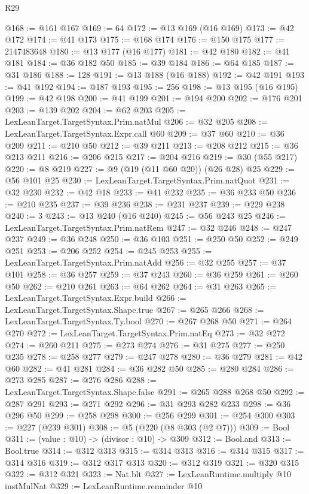 \begin{lexlean}{R29}
\begin{coremodule}
@168 := @161 @167
@169 := 64
@172 := @13 @169 (@16 @169)
@173 := @42 @172
@174 := @41 @173
@175 := @168 @174
@176 := @150 @175
@177 := 2147483648
@180 := @13 @177 (@16 @177)
@181 := @42 @180
@182 := @41 @181
@184 := @36 @182 @50
@185 := @39 @184
@186 := @64 @185
@187 := @31 @186
@188 := 128
@191 := @13 @188 (@16 @188)
@192 := @42 @191
@193 := @41 @192
@194 := @187 @193
@195 := 256
@198 := @13 @195 (@16 @195)
@199 := @42 @198
@200 := @41 @199
@201 := @194 @200
@202 := @176 @201
@203 := @139 @202
@204 := @62 @203
@205 := LexLeanTarget.TargetSyntax.Prim.natMul
@206 := @32 @205
@208 := LexLeanTarget.TargetSyntax.Expr.call @60
@209 := @37 @60
@210 := @36 @209
@211 := @210 @50
@212 := @39 @211
@213 := @208 @212
@215 := @36 @213 @211
@216 := @206 @215
@217 := @204 @216
@219 := @30 (@55 @217)
@220 := @8 @219
@227 := @9 (@19 (@11 @60 @20)) (@26 @28) @25
@229 := @56 @101 @25
@230 := LexLeanTarget.TargetSyntax.Prim.natQuot
@231 := @32 @230
@232 := @42 @18
@233 := @41 @232
@235 := @36 @233 @50
@236 := @210 @235
@237 := @39 @236
@238 := @231 @237
@239 := @229 @238
@240 := 3
@243 := @13 @240 (@16 @240)
@245 := @56 @243 @25
@246 := LexLeanTarget.TargetSyntax.Prim.natRem
@247 := @32 @246
@248 := @247 @237
@249 := @36 @248
@250 := @36 @103
@251 := @250 @50
@252 := @249 @251
@253 := @206 @252
@254 := @245 @253
@255 := LexLeanTarget.TargetSyntax.Prim.natAdd
@256 := @32 @255
@257 := @37 @101
@258 := @36 @257
@259 := @37 @243
@260 := @36 @259
@261 := @260 @50
@262 := @210 @261
@263 := @64 @262
@264 := @31 @263
@265 := LexLeanTarget.TargetSyntax.Expr.build
@266 := LexLeanTarget.TargetSyntax.Shape.true
@267 := @265 @266
@268 := LexLeanTarget.TargetSyntax.Ty.bool
@270 := @267 @268 @50
@271 := @264 @270
@272 := LexLeanTarget.TargetSyntax.Prim.natEq
@273 := @32 @272
@274 := @260 @211
@275 := @273 @274
@276 := @31 @275
@277 := @250 @235
@278 := @258 @277
@279 := @247 @278
@280 := @36 @279
@281 := @42 @60
@282 := @41 @281
@284 := @36 @282 @50
@285 := @280 @284
@286 := @273 @285
@287 := @276 @286
@288 := LexLeanTarget.TargetSyntax.Shape.false
@291 := @265 @288 @268 @50
@292 := @287 @291
@293 := @271 @292
@296 := @31 @293 @282 @233
@298 := @36 @296 @50
@299 := @258 @298
@300 := @256 @299
@301 := @254 @300
@303 := @227 (@239 @301)
@308 := @5 (@220 (@8 @303 (@2 @7)))
@309 := Bool
@311 := (value : @10) -> (divisor : @10) -> @309
@312 := Bool.and
@313 := Bool.true
@314 := @312 @313
@315 := @314 @313
@316 := @314 @315
@317 := @314 @316
@319 := @312 @317 @313
@320 := @312 @319
@321 := @320 @315
@322 := @312 @321
@323 := Nat.blt
@327 := LexLeanRuntime.multiply @10 instMulNat
@329 := LexLeanRuntime.remainder @10

\end{coremodule}
\end{lexlean}

